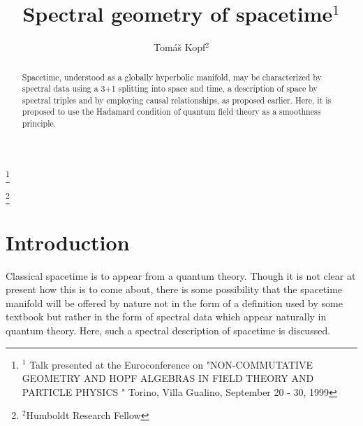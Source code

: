 \documentclass[a4paper,10pt,oneside]{amsart}
\theoremstyle{plain}
\theoremstyle{definition}
\theoremstyle{remark}
\begin{document}



\title[]{Spectral geometry of spacetime${ }^{1}$}\thanks{${ }^{1}$
Talk presented at the Euroconference on
      "NON-COMMUTATIVE GEOMETRY AND HOPF ALGEBRAS IN FIELD THEORY
                         AND PARTICLE PHYSICS "
         Torino, Villa Gualino, September 20 - 30, 1999}
\author{Tom\'{a}\v{s} Kopf${ }^{2}$}\thanks{${ }^{2}$Humboldt Research Fellow}

\address{ThEP, Institut f\"{u}r Physik, Johannes Gutenberg-Universit\"{a}t, \\
55099 Mainz, Germany}

\address{Matematical Institute of the Silesian University at Opava\\
Bezru\v{c}ovo n\'{a}m\v{e}st\'{i} 13 \\ 746 01 Opava, Czech Republic}

\address{Department of Physics, University of Alberta\\
Edmonton T6G 2G1, Canada}





\begin{abstract}
Spacetime, understood as a globally hyperbolic manifold, may be
characterized by spectral data using a 3+1 splitting into space
and time, a description of space by spectral triples and by
employing causal relationships, as proposed earlier.
Here, it is proposed to use the
Hadamard condition of quantum field theory as a smoothness principle.
\end{abstract}

\maketitle





\section{Introduction}


Classical spacetime is to appear from a quantum theory.
Though it is not clear
at present how this is to come about, there is some possibility
that the spacetime manifold will be offered by nature not in the
form of a definition used by some textbook but rather in the
form of spectral data which appear naturally in quantum theory.
Here, such a spectral description of spacetime is discussed.
\end{document}

